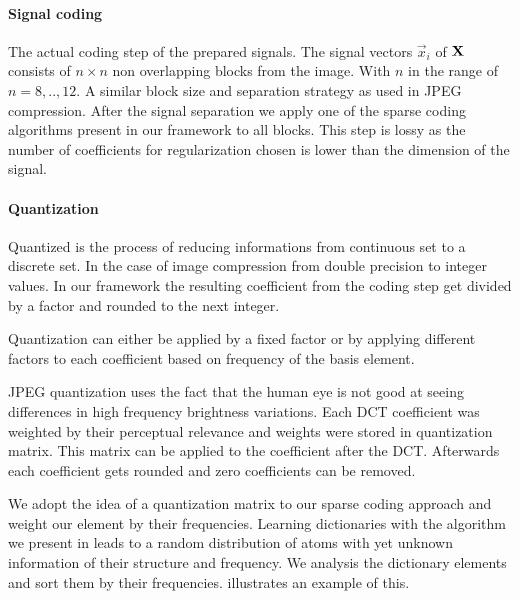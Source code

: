 

\paragraph{Signal coding}
The actual coding step of the prepared signals. The signal vectors $\vec{x}_i$
of $\boldsymbol{\mathrm{X}}$ consists of $n \times n$ non overlapping blocks from the image.
With $n$ in the range of $n=8,..,12$. A similar block size and separation
strategy as used in JPEG compression. After the signal separation we apply one
of the sparse coding algorithms present in our framework to all blocks. This
step is lossy as the number of coefficients for regularization chosen is lower
than the dimension of the signal. 

\paragraph{Quantization}
Quantized is the process of reducing informations from continuous set to a
discrete set. In the case of image compression from double precision to integer
values. In our framework the resulting coefficient from the coding step get
divided by a factor and rounded to the next integer.  

Quantization can either be applied by a fixed factor or by applying different 
factors to each coefficient based on frequency of the basis element.

JPEG quantization uses the fact that the human eye is not good at seeing
differences in high frequency brightness variations. Each DCT coefficient was
weighted by their perceptual relevance and weights were stored in quantization
matrix. This matrix can be applied to the coefficient after the DCT. 
Afterwards each coefficient gets rounded and zero coefficients can be removed.

We adopt the idea of a quantization matrix to our sparse coding approach and
weight our element by their frequencies. Learning dictionaries with the
algorithm we present in  leads to a random distribution of
atoms with yet unknown information of their structure and frequency. We analysis
the dictionary elements and sort them by their frequencies.
 illustrates an example of this.


